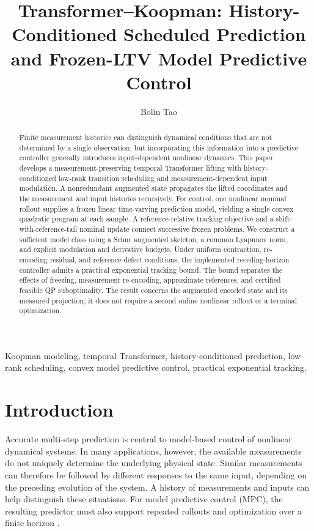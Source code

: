 \documentclass[journal]{IEEEtran}
\begin{document}
\title{Transformer--Koopman: History-Conditioned Scheduled Prediction and Frozen-LTV Model Predictive Control}
\author{Bolin Tao}
\maketitle

\begin{abstract}
Finite measurement histories can distinguish dynamical conditions that are not determined by a single observation, but incorporating this information into a predictive controller generally introduces input-dependent nonlinear dynamics. This paper develops a measurement-preserving temporal Transformer lifting with history-conditioned low-rank transition scheduling and measurement-dependent input modulation. A nonredundant augmented state propagates the lifted coordinates and the measurement and input histories recursively. For control, one nonlinear nominal rollout supplies a frozen linear time-varying prediction model, yielding a single convex quadratic program at each sample. A reference-relative tracking objective and a shift-with-reference-tail nominal update connect successive frozen problems. We construct a sufficient model class using a Schur augmented skeleton, a common Lyapunov norm, and explicit modulation and derivative budgets. Under uniform contraction, re-encoding residual, and reference-defect conditions, the implemented receding-horizon controller admits a practical exponential tracking bound. The bound separates the effects of freezing, measurement re-encoding, approximate references, and certified feasible QP suboptimality. The result concerns the augmented encoded state and its measured projection; it does not require a second online nonlinear rollout or a terminal optimization.
\end{abstract}
\begin{IEEEkeywords}
Koopman modeling, temporal Transformer, history-conditioned prediction, low-rank scheduling, convex model predictive control, practical exponential tracking.
\end{IEEEkeywords}

\section{Introduction}
\label{sec:introduction}
Accurate multi-step prediction is central to model-based control of nonlinear dynamical systems. In many applications, however, the available measurements do not uniquely determine the underlying physical state. Similar measurements can therefore be followed by different responses to the same input, depending on the preceding evolution of the system. A history of measurements and inputs can help distinguish these situations. For model predictive control (MPC), the resulting predictor must also support repeated rollouts and optimization over a finite horizon \cite{ljung1999system,nelles2020nonlinear,forgione2021dynonet}.
\end{document}
